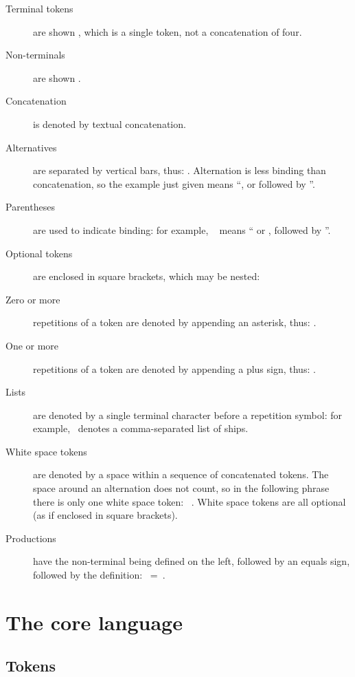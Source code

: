 \documentclass[english]{article}
\begin{document}
\begin{description}
\item[Terminal tokens]are shown , which is a single token,
  not a concatenation of four.
\item[Non-terminals]are shown .
\item[Concatenation]is denoted by textual concatenation.
\item[Alternatives]are separated by vertical bars, thus:
  \Alt{}. Alternation is less binding than
  concatenation, so the example just given means ``, or
   followed by ''.
\item[Parentheses]are used to indicate binding: for example,
  \lbrac{}\alt{}\rbrac\  means `` or
  , followed by ''.
\item[Optional tokens]are enclosed in square brackets, which may be
  nested:\\
\item[Zero or more]repetitions of a token are denoted by appending an
  asterisk, thus: \closure.
\item[One or more]repetitions of a token are denoted by appending a
  plus sign, thus: \pclosure.
\item[Lists]are denoted by a single terminal character before a
  repetition symbol: for example, \conc{,}\pclosure\ 
  denotes a comma-separated list of ships.
\item[White space tokens]are denoted by a space within a sequence of
  concatenated tokens. The space around an alternation does not count,
  so in the following phrase there is only one white space token:
  \mbox{\nont{A} \nont{B}\Alt\nont{C}\nont{D}}. White space tokens are
  all optional (as if enclosed in square brackets).
\item[Productions]have the non-terminal being defined on the left,
  followed by an equals sign, followed by the definition:
  \mbox{ = }.
\end{description}



\section{The core language}

\subsection{Tokens}
\end{document}
